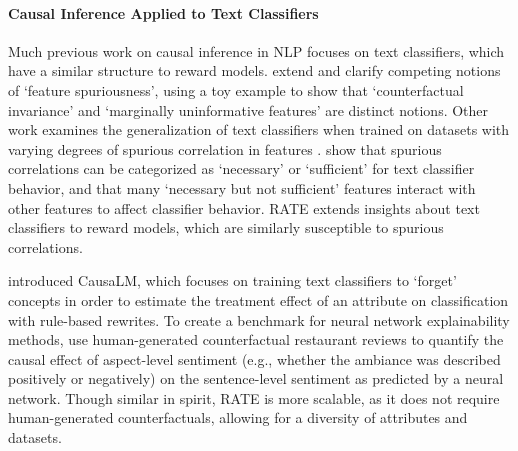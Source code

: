 \documentclass{article}
\begin{document}
\paragraph{Causal Inference Applied to Text Classifiers} Much previous work on causal inference in NLP focuses on text classifiers, which have a similar structure to reward models.
\citet{eisenstein2022informativenessinvarianceperspectivesspurious} extend and clarify competing notions of `feature spuriousness', using a toy example to show that `counterfactual invariance' and `marginally uninformative features' are distinct notions. Other work examines the generalization of text classifiers when trained on datasets with varying degrees of spurious correlation in features \citep{kaushik2020learningdifferencemakesdifference}. \citet{joshi-etal-2022-spurious} show that spurious correlations can be categorized as `necessary' or `sufficient' for text classifier behavior, and that many `necessary but not sufficient' features interact with other features to affect classifier behavior. RATE extends insights about text classifiers to reward models, which are similarly susceptible to spurious correlations.

\citet{Feder_2021} introduced CausaLM, which focuses on training text classifiers to `forget' concepts in order to estimate the treatment effect of an attribute on classification with rule-based rewrites. To create a benchmark for neural network explainability methods, \citet{abraham2022cebab} use human-generated counterfactual restaurant reviews to quantify the causal effect of aspect-level sentiment (e.g., whether the ambiance was described positively or negatively) on the sentence-level sentiment as predicted by a neural network. Though similar in spirit, RATE is more scalable, as it does not require human-generated counterfactuals, allowing for a diversity of attributes and datasets.
\end{document}
